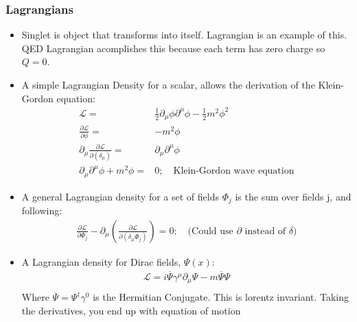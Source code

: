 \subsubsection{Lagrangians}
\begin{itemize}
        \item Singlet is object that transforms into itself. Lagrangian is an example of this. QED Lagrangian acomplishes this because each term has zero charge so $Q=0$. \cite{wells}
    \item A simple Lagrangian Density for a scalar, allows the derivation of the Klein-Gordon equation: \cite{wells}
            \begin{equation}\begin{split}
            \mathcal{L}=&\frac{1}{2}\partial_\mu\phi\partial^\mu\phi-\frac{1}{2}m^2\phi^2 \\
            \frac{\partial\mathcal{L}}{\partial\phi}=&-m^2\phi \\
            \partial_\mu\frac{\partial\mathcal{L}}{\partial(\delta_\mu)}=&\partial_\mu\partial^\mu\phi \\
            \partial_\mu\partial^\mu\phi+m^2\phi=&0; \quad\text{Klein-Gordon wave equation}
            \end{split}\end{equation}
    \item A general Lagrangian density for a set of fields $\Phi_j$ is the sum over fields j, and following: \cite{wells}
        \begin{equation}\begin{split}
            \frac{\partial\mathcal{L}}{\partial\Phi_j}-\partial_\mu\left(\frac{\partial\mathcal{L}}{\partial(\delta_\mu\Phi_j)}\right)=0; \quad\text{(Could use $\partial$ instead of $\delta$)}
        \end{split}\end{equation}
    \item A Lagrangian density for Dirac fields, $\Psi(x)$: \cite{wells}
        \begin{equation}\begin{split}
            \mathcal{L}=i\overline{\Psi}\gamma^\mu\partial_\mu\Psi-m\overline{\Psi}\Psi \\
        \end{split}\end{equation}
        Where $\overline{\Psi}=\Psi^\dagger\gamma^0$ is the Hermitian Conjugate. This is lorentz invariant. Taking the derivatives, you end up with equation of motion
        \begin{equation}\begin{split}

\end{split}
\end{equation}
\end{itemize}
